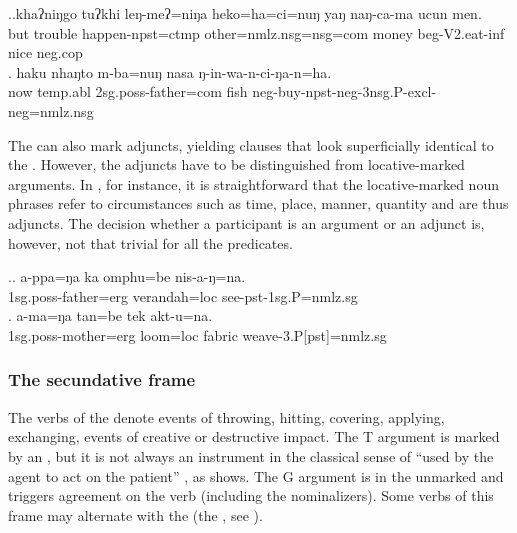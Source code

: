  
\ex.\ag.khaʔniŋgo tuʔkhi leŋ-meʔ=niŋa  heko=ha=ci=nuŋ  yaŋ  naŋ-ca-ma ucun men.\\
but        trouble happen{\sc [3sg]-npst=ctmp} other{\sc=nmlz.nsg=nsg=com}  money beg{\sc-V2.eat-inf} nice {\sc neg.cop}\\
 
		\bg. haku nhaŋto    m-ba=nuŋ                nasa ŋ-in-wa-n-ci-ŋa-n=ha.\\
		now {\sc temp.abl} {\sc 2sg.poss-}father{\sc =com} fish {\sc neg-}buy{\sc -npst-neg-3nsg.P-excl-neg=nmlz.nsg}\\
		 

The  can also mark adjuncts, yielding clauses that look superficially identical to the . However, the adjuncts have to be distinguished from locative-marked arguments. In \Next, for instance, it is straightforward that the locative-marked noun phrases refer to  circumstances  such as time, place, manner, quantity \citep[108]{Tesniere1959Elements} and are thus adjuncts. The decision whether a participant is an argument or an adjunct is, however, not that trivial for all the predicates.

\ex.\ag. a-ppa=ŋa ka omphu=be nis-a-ŋ=na.\\
{\sc 1sg.poss-}father{\sc =erg}  verandah{\sc =loc} see{\sc -pst-1sg.P=nmlz.sg}\\
\bg. a-ma=ŋa tan=be tek akt-u=na.\\
{\sc 1sg.poss-}mother{\sc =erg} loom{\sc =loc} fabric weave{\sc -3.P[pst]=nmlz.sg}\\
 
\subsubsection{The secundative frame}


\noindent
The verbs of the  denote events of throwing, hitting, covering, applying, exchanging, events of creative or destructive impact. The T argument is marked by an  , but it is not always an instrument in the classical sense of “used by the agent to act on the patient” \citep[140]{Andrews1985The-major}, as \Next[a] shows. The G argument is  in the unmarked  and triggers agreement on the verb (including the nominalizers). Some verbs of this frame may alternate with the  (the , see ).

